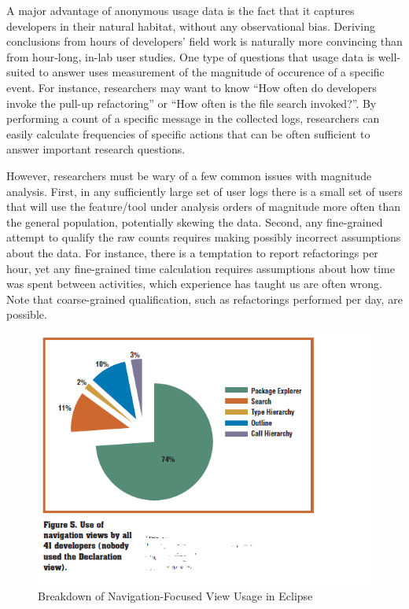 A major advantage of anonymous usage data is the fact that it captures developers in their natural habitat, without any observational bias. Deriving conclusions from hours of developers' field work is naturally more convincing than from hour-long, in-lab user studies. One type of questions that usage data is well-suited to answer uses measurement of the magnitude of occurence of a specific event. For instance, researchers may want to know ``How often do developers invoke the pull-up refactoring'' or ``How often is the file search invoked?''. By performing a count of a specific message in the collected logs, researchers can easily calculate frequencies of specific actions that can be often sufficient to answer important research questions. 

However, researchers must be wary of a few common issues with magnitude analysis. First, in any sufficiently large set of user logs there is a small set of users that will use the feature/tool under analysis orders of magnitude more often than the general population, potentially skewing the data. Second, any fine-grained attempt to qualify the raw counts requires making possibly incorrect assumptions about the data. For instance, there is a temptation to report refactorings per hour, yet any fine-grained time calculation requires assumptions about how time was spent between activities, which experience has taught us are often wrong. Note that coarse-grained qualification, such as refactorings performed per day, are possible.   

\begin{figure}
  \centering
  \includegraphics{AnalyzingUsageData/eclipse}
  \caption{Breakdown of Navigation-Focused View Usage in Eclipse}\label{fig:eclipse}
\end{figure}


